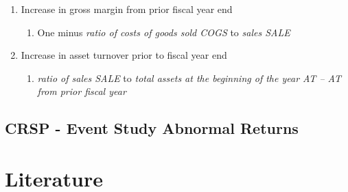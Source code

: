 \documentclass[12pt]{article}
\begin{document}
\begin{enumerate}
\begin{enumerate}
                \item Increase in gross margin from prior fiscal year end 

                    \begin{enumerate}
                        \item One minus \emph{ratio of costs of goods sold COGS} to \emph{sales SALE}
                    \end{enumerate}

                \item Increase in asset turnover prior to fiscal year end 

                    \begin{enumerate}
                        \item \emph{ratio of sales SALE} to \emph{total assets at the beginning of the year AT -- AT from prior fiscal year}
                    \end{enumerate}


            \end{enumerate}
                    
            

    \end{enumerate}


    \subsection{CRSP - Event Study Abnormal Returns}


\section{Literature}









\printbibliography
\end{document}
